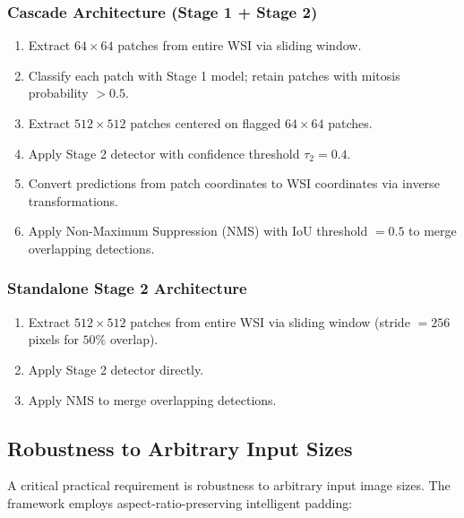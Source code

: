 \documentclass[journal]{IEEEtran}
\begin{document}
\subsubsection{Cascade Architecture (Stage 1 + Stage 2)}
\begin{enumerate}
\item Extract $64 \times 64$ patches from entire WSI via sliding window.
\item Classify each patch with Stage 1 model; retain patches with mitosis probability $> 0.5$.
\item Extract $512 \times 512$ patches centered on flagged $64 \times 64$ patches.
\item Apply Stage 2 detector with confidence threshold $\tau_2 = 0.4$.
\item Convert predictions from patch coordinates to WSI coordinates via inverse transformations.
\item Apply Non-Maximum Suppression (NMS) with IoU threshold $= 0.5$ to merge overlapping detections.
\end{enumerate}

\subsubsection{Standalone Stage 2 Architecture}
\begin{enumerate}
\item Extract $512 \times 512$ patches from entire WSI via sliding window (stride $= 256$ pixels for $50\%$ overlap).
\item Apply Stage 2 detector directly.
\item Apply NMS to merge overlapping detections.
\end{enumerate}

\subsection{Robustness to Arbitrary Input Sizes}
A critical practical requirement is robustness to arbitrary input image sizes. The framework employs aspect-ratio-preserving intelligent padding:
\end{document}
